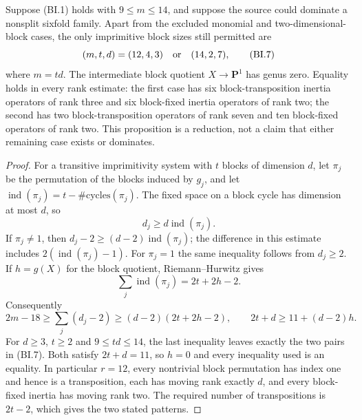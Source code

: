 \begin{proposition}
\label{D-BI-04}
Suppose (BI.1) holds with $9\le m\le14$, and suppose the source
could dominate a nonsplit sixfold family.  Apart from the excluded
monomial and two-dimensional-block cases, the only imprimitive
block sizes still permitted are
\[
            (m,t,d)=(12,4,3)\quad\hbox{or}\quad(14,2,7),
\tag{BI.7}
\]
where $m=td$.  The intermediate block quotient $X\to\mathbf P^1$
has genus zero.  Equality holds in every rank estimate: the first
case has six block-transposition inertia operators of rank three
and six block-fixed inertia operators of rank two; the second has
two block-transposition operators of rank seven and ten block-fixed
operators of rank two.  This proposition is a reduction, not a
claim that either remaining case exists or dominates.
\end{proposition}
\begin{proof}
For a transitive imprimitivity system with $t$ blocks of dimension
$d$, let $\pi_j$ be the permutation of the blocks induced by
$g_j$, and let $\operatorname{ind}(\pi_j)=t-\#\text{cycles}(\pi_j)$.
The fixed space on a block cycle has dimension at most $d$, so
\[
             d_j\ge d\operatorname{ind}(\pi_j).
\]
If $\pi_j\ne1$, then
$d_j-2\ge(d-2)\operatorname{ind}(\pi_j)$; the difference in this
estimate includes $2(\operatorname{ind}(\pi_j)-1)$.
For $\pi_j=1$ the same inequality follows from $d_j\ge2$.
If $h=g(X)$ for the block quotient, Riemann--Hurwitz gives
\[
 \sum_j\operatorname{ind}(\pi_j)=2t+2h-2.
\]
Consequently
\[
 2m-18\ge\sum_j(d_j-2)
       \ge(d-2)(2t+2h-2),
\qquad
 2t+d\ge11+(d-2)h.
\tag{BI.8}
\]
For $d\ge3$, $t\ge2$ and $9\le td\le14$, the last inequality
leaves exactly the two pairs in (BI.7).  Both satisfy $2t+d=11$,
so $h=0$ and every inequality used is an equality.  In particular
$r=12$, every nontrivial block permutation has index one and hence
is a transposition, each has moving rank exactly $d$, and every
block-fixed inertia has moving rank two.  The required number of
transpositions is $2t-2$, which gives the two stated patterns.
\end{proof}

